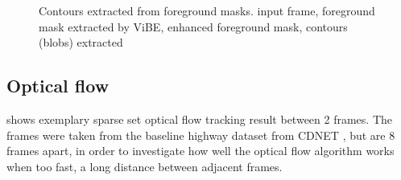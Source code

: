 \begin{figure}[htb]
  \centering
  \caption{Contours extracted from foreground masks.  input frame,  foreground mask extracted by ViBE,  enhanced foreground mask,  contours (blobs) extracted}
  \label{imp:cca}
\end{figure}


\subsection{Optical flow}

 shows exemplary sparse set optical flow tracking result between 2 frames. The frames were taken from the baseline highway dataset from CDNET \cite{goyette2012changedetection}, but are 8 frames apart, in order to investigate how well the optical flow algorithm works when  too fast,  a long distance between adjacent frames.

